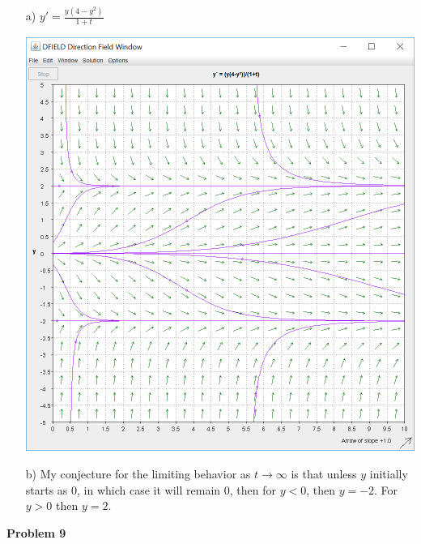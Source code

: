 \documentclass[10pt]{article}
\begin{document}
            \begin{enumerate}
                \item[a)] $y'=\frac{y(4-y^2)}{1+t}$ \begin{center}\includegraphics[scale=0.5]{lab1p3p8.PNG}\end{center}
                \item[b)] My conjecture for the limiting behavior as $t \rightarrow \infty$ is that unless $y$ initially starts as 0, in which case it will remain 0, then for $y<0$, then $y=-2$. For $y>0$ then $y=2$.
            \end{enumerate}
        {\bf Problem 9}
\end{document}
